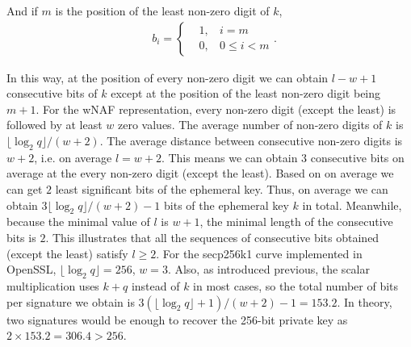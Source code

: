 And if $m$ is the position of the least non-zero digit of $k$,
 \begin{align}
 &b_{i} = \left\{
 \begin{aligned}
 	&1,\,\;\ \   i = m \\
 	&0,\,\;\ \   0 \leq i < m
 \end{aligned}
 \right.  .
 \end{align}

In this way, at the position of every non-zero digit we can obtain $l - w + 1$ consecutive bits of $k$
 except at the  position of the least non-zero digit being $m+1$.
For the wNAF representation, every non-zero digit (except the least) is followed by at least $w$ zero values.
 The average number of non-zero digits of $k$ is $\lfloor\log_{2}{q}\rfloor /(w+2)$.
 The average distance between consecutive non-zero digits is $w+2$, i.e. on average $l = w + 2$.
 This means we can obtain $3$ consecutive bits on average at the every non-zero digit (except the least).
Based on \cite{Benger2014} on average we can get $2$ least significant bits of the ephemeral key.
Thus, on average we can obtain $3\lfloor\log_{2}{q}\rfloor /(w+2) - 1$ bits of the ephemeral key $k$ in total.
Meanwhile, because the minimal value of $l$ is $w + 1$, the minimal length of the consecutive bits is $2$.
This illustrates that all the sequences of consecutive bits obtained (except the least) satisfy $l \geq 2$.
For the secp256k1 curve implemented in OpenSSL, $\lfloor\log_{2}{q}\rfloor = 256$, $w = 3$.
 Also, as introduced previous, the scalar multiplication uses $k+q$ instead of $k$ in most cases,
  so the total number of bits per signature we obtain is $3(\lfloor\log_{2}{q}\rfloor +1)/(w+2)-1 = 153.2$.
In theory, two signatures would be enough to recover the 256-bit private key as $2\times 153.2 = 306.4 > 256$.


%


